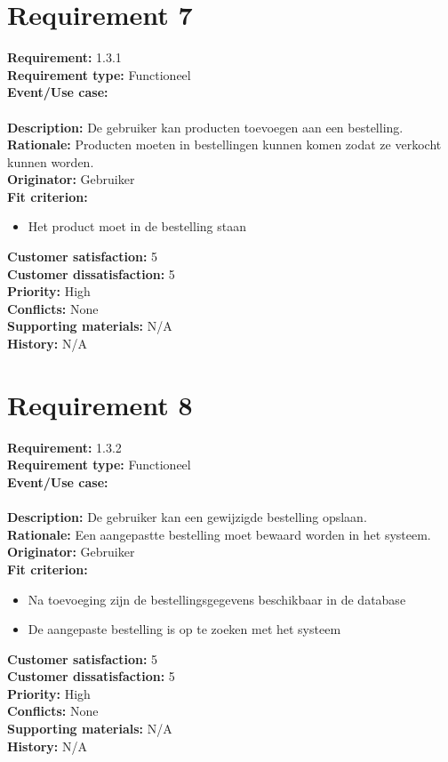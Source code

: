 \documentclass[11pt,english]{article}
\begin{document}
	\newpage
	\section{Requirement 7}
	\textbf{Requirement:} 1.3.1 \\
	\textbf{Requirement type:} Functioneel \\
	\textbf{Event/Use case:} \\
	\\
	\textbf{Description:} De gebruiker kan producten toevoegen aan een bestelling. \\
	\textbf{Rationale:} Producten moeten in bestellingen kunnen komen zodat ze verkocht kunnen worden. \\
	\textbf{Originator:} Gebruiker \\
	\textbf{Fit criterion:}
	\begin{itemize}
		\item Het product moet in de bestelling staan
	\end{itemize}
	\textbf{Customer satisfaction:} 5 \\
	\textbf{Customer dissatisfaction:} 5 \\
	\textbf{Priority:} High \\
	\textbf{Conflicts:} None \\
	\textbf{Supporting materials:} N/A \\
	\textbf{History:} N/A \\

	\newpage
	\section{Requirement 8}
	\textbf{Requirement:} 1.3.2 \\
	\textbf{Requirement type:} Functioneel \\
	\textbf{Event/Use case:} \\
	\\
	\textbf{Description:} De gebruiker kan een gewijzigde bestelling opslaan. \\
	\textbf{Rationale:} Een aangepastte bestelling moet bewaard worden in het systeem. \\
	\textbf{Originator:} Gebruiker \\
	\textbf{Fit criterion:}
	\begin{itemize}
		\item Na toevoeging zijn de bestellingsgegevens beschikbaar in de database
		\item De aangepaste bestelling is op te zoeken met het systeem
	\end{itemize}
	\textbf{Customer satisfaction:} 5 \\
	\textbf{Customer dissatisfaction:} 5 \\
	\textbf{Priority:} High \\
	\textbf{Conflicts:} None \\
	\textbf{Supporting materials:} N/A \\
	\textbf{History:} N/A \\
\end{document}
